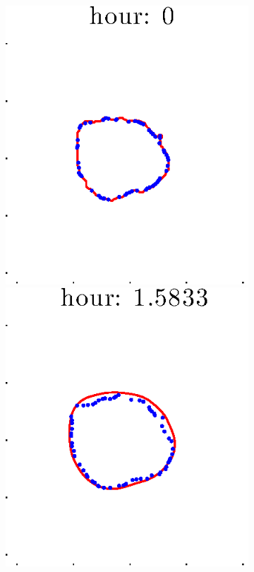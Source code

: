 \documentclass[12pt]{article}
\begin{document}
\begin{figure}[h!]
\begin{subfigure}[b]{.3\textwidth}
	\end{subfigure}
	\begin{subfigure}[b]{.3\textwidth}
	\centering
		\includegraphics[height=.15\textheight]{Pos5exp2/full/second1.eps}
		\includegraphics[height=.15\textheight]{Pos5exp2/full/second2.eps}

\end{subfigure}
\end{figure}
\end{document}
